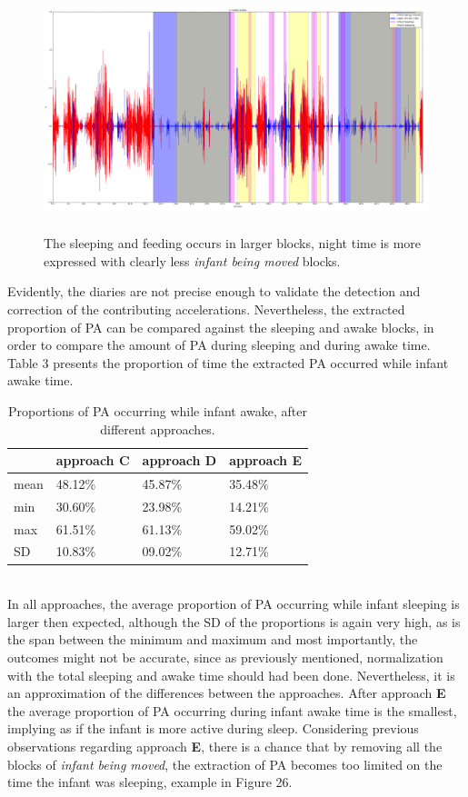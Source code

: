 \documentclass{article}
\begin{document}
{\begin{figure}[h]
\includegraphics[width=15cm, height=7cm]{4moved.png}
\caption{The sleeping and feeding occurs in larger blocks, night time is more expressed with clearly less \textit{infant being moved} blocks.}
\end{figure}
Evidently, the diaries are not precise enough to validate the detection and correction of the contributing accelerations. Nevertheless, the extracted proportion of PA can be compared against the sleeping and awake blocks, in order to compare the amount of PA during sleeping and during awake time. Table 3 presents the proportion of time the extracted PA occurred while infant awake time.\\
\begin{table}[h]
\centering
\begin{tabular}{|l|l|l|l|}
\hline
  & approach C & approach D & approach E \\ \hline
mean & 48.12\% & 45.87\% & 35.48\% \\ \hline
min & 30.60\% & 23.98\% & 14.21\% \\ \hline
max & 61.51\% & 61.13\% & 59.02\% \\ \hline
SD & 10.83\% & 09.02\% & 12.71\% \\ \hline
\end{tabular}
\caption{Proportions of PA occurring while infant awake, after different approaches.}
\end{table}
\\
In all approaches, the average proportion of PA occurring while infant sleeping is larger then expected, although the SD of the proportions is again very high, as is the span between the minimum and maximum and most importantly, the outcomes might not be accurate, since as previously mentioned, normalization with the total sleeping and awake time should had been done. Nevertheless, it is an approximation of the differences between the approaches. After approach \textbf{E} the average proportion of PA occurring during infant awake time is the smallest, implying as if the infant is more active during sleep. Considering previous observations regarding approach \textbf{E}, there is a chance that by removing all the blocks of \textit{infant being moved}, the extraction of PA becomes too limited on the time the infant was sleeping, example in Figure 26.
}
\end{document}
